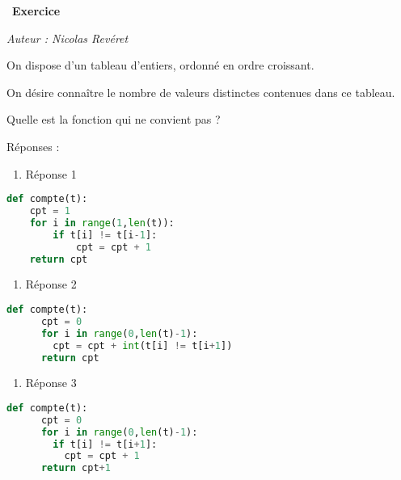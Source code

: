 \documentclass[
  11pt,
]{article}
\providecommand{\tightlist}{%
  \setlength{\itemsep}{0pt}\setlength{\parskip}{0pt}}
\newcounter{exo}
\newenvironment{exercice}[1]
{\par \medskip   \addtocounter{exo}{1} \noindent  
\begin{bclogo}[arrondi =0.1,   noborder = true, logo=\bccrayon, marge=4]{~\textbf{Exercice} \textbf{\theexo} {\itshape #1} }  \par}
{
\end{bclogo}
 \par \bigskip }
\newcounter{def}
\begin{document}
\begin{exercice}{}

\emph{Auteur : Nicolas Revéret}

On dispose d'un tableau d'entiers, ordonné en ordre croissant.

On désire connaître le nombre de valeurs distinctes contenues dans ce
tableau.

Quelle est la fonction qui ne convient pas ?

Réponses :

\begin{enumerate}
\def\labelenumi{\arabic{enumi}.}
\tightlist
\item
  Réponse 1
\end{enumerate}

\begin{lstlisting}[language=Python]
def compte(t):
    cpt = 1
    for i in range(1,len(t)):
        if t[i] != t[i-1]:
            cpt = cpt + 1
    return cpt
\end{lstlisting}

\begin{enumerate}
\def\labelenumi{\arabic{enumi}.}
\setcounter{enumi}{1}
\tightlist
\item
  Réponse 2
\end{enumerate}

\begin{lstlisting}[language=Python]
    def compte(t):
      cpt = 0
      for i in range(0,len(t)-1):
        cpt = cpt + int(t[i] != t[i+1])
      return cpt
\end{lstlisting}

\begin{enumerate}
\def\labelenumi{\arabic{enumi}.}
\setcounter{enumi}{2}
\tightlist
\item
  Réponse 3
\end{enumerate}

\begin{lstlisting}[language=Python]
    def compte(t):
      cpt = 0
      for i in range(0,len(t)-1):
        if t[i] != t[i+1]:
          cpt = cpt + 1
      return cpt+1
\end{lstlisting}

\end{exercice}
\end{document}
